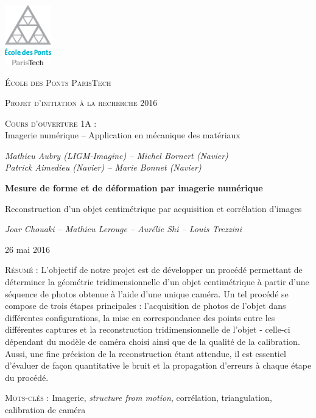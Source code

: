 \documentclass[11pt]{report}
\begin{document}
\begin{titlepage}
	\centering
	\includegraphics[width=0.15\textwidth]{logo-enpc.eps}\par\vspace{1cm}
	{\scshape\LARGE École des Ponts ParisTech \par}
	\vspace{1cm}
	{\scshape\Large Projet d'initiation à la recherche 2016 \par}
	\vspace{1cm}
	{\Large {\scshape Cours d'ouverture 1A : } \\ Imagerie numérique -- Application en mécanique des matériaux \par}
	\medskip
	{\Large\itshape Mathieu Aubry (LIGM-Imagine) -- Michel Bornert (Navier) \\ Patrick Aimedieu (Navier) -- Marie Bonnet (Navier) \par}
	\vspace{1.5cm}
	{\huge\bfseries Mesure de forme et de déformation par imagerie numérique \par}
	{\Large Reconstruction d’un objet centimétrique par acquisition et corrélation d’images \par}
	\medskip
	{\Large\itshape Joar Chouaki -- Mathieu Lerouge -- Aurélie Shi -- Louis Trezzini\par}
	\medskip
	{\large 26 mai 2016 \par}

	\vfill
	\begin{minipage}{16cm}
    {\normalsize
     \parindent=0pt
     {\scshape Résumé :} L’objectif de notre projet est de développer un procédé permettant de déterminer la géométrie tridimensionnelle d’un objet centimétrique à partir d'une séquence de photos obtenue à l'aide d'une unique caméra. Un tel procédé se compose de trois étapes principales : l'acquisition de photos de l’objet dans différentes configurations, la mise en correspondance des points entre les différentes captures et la reconstruction tridimensionnelle de l’objet - celle-ci dépendant du modèle de caméra choisi ainsi que de la qualité de la calibration. Aussi, une fine précision de la reconstruction étant attendue, il est essentiel d'évaluer de façon quantitative le bruit et la propagation d'erreurs à chaque étape du procédé.
     \par
    }
    \end{minipage}

    \medskip

    \begin{minipage}{16cm}
    {\normalsize
    \parindent=0pt
        {\scshape Mots-clés :} Imagerie, \emph{structure from motion}, corrélation, triangulation, calibration de caméra
    \par}
    \end{minipage}
\end{titlepage}
\end{document}
